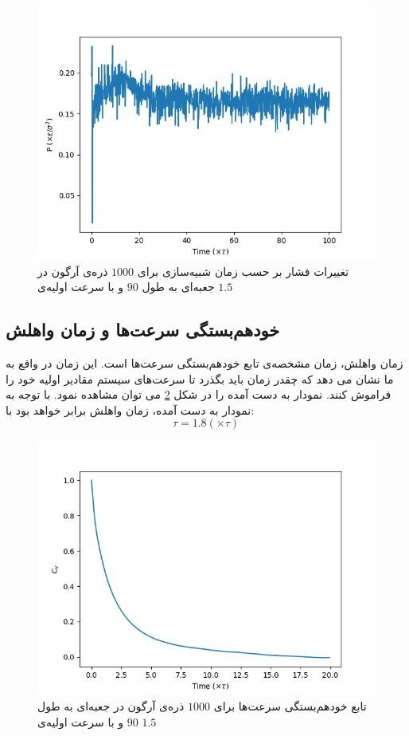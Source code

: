 \documentclass[11pt, a4paper]{article}
\begin{document}
\begin{figure}[h!]
	\centering
  \includegraphics[width=.7\textwidth]{MD_90_1000_2_0.001_pressures.jpg}
  \caption{تغییرات فشار بر حسب زمان شبیه‌سازی برای $1000$ ذره‌ی آرگون در جعبه‌ای به طول $90$ و با سرعت اولیه‌ی $1.5$}
  \label{fig:1000_pressure}
\end{figure}


\subsection{خودهم‌بستگی سرعت‌ها و زمان واهلش}
زمان واهلش، زمان مشخصه‌ی تابع خود‌هم‌بستگی سرعت‌ها است.
این زمان در واقع به ما نشان می دهد که چقدر زمان باید بگذرد تا سرعت‌های سیستم مقادیر اولیه خود را فراموش کنند.
نمودار به دست آمده را در شکل
\ref{fig:1000_c_v}
می توان مشاهده نمود.
با توجه به نمودار به دست آمده، زمان واهلش برابر خواهد بود با:
\begin{equation}
  \tau = 1.8 (\times \tau)
\end{equation}

\begin{figure}[h!]
	\centering
  \includegraphics[width=.7\textwidth]{MD_90_1000_2_0.001_c_v.jpg}
  \caption{تابع خود‌هم‌بستگی سرعت‌ها برای $1000$ ذره‌ی آرگون در جعبه‌ای به طول $90$ و با سرعت اولیه‌ی $1.5$}
  \label{fig:1000_c_v}
\end{figure}
\end{document}
